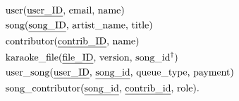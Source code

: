 \documentclass{report}
\title{\Huge{}}
\author{\huge{Nathan Warner}}
\date{\huge{}}
\begin{document}
    \tableofcontents
    \pagebreak 
    \begin{align*}
        &\text{user(\underline{user\_ID}, email, name)} \\
        &\text{song(\underline{song\_ID}, artist\_name, title)} \\
        &\text{contributor(\underline{contrib\_ID}, name)} \\
        &\text{karaoke\_file(\underline{file\_ID}, version, song\_id$^{\dag}$)} \\
        &\text{user\_song(\underline{user\_ID}, \underline{song\_id}, queue\_type, payment)} \\
        &\text{song\_contributor(\underline{song\_id}, \underline{contrib\_id}, role)}
    .\end{align*}



    
\end{document}
